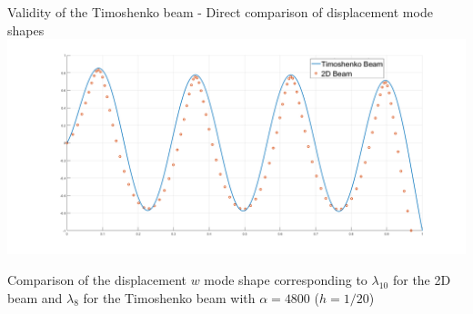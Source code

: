 \documentclass[8pt]{beamer}
\begin{document}
        \begin{frame}{Validity of the Timoshenko beam - Direct comparison of displacement mode shapes}
            \centering
            \includegraphics[scale=0.2]{1Dv2D.png} %
            \par
            \footnotesize Comparison of the displacement $w$ mode shape corresponding to $\lambda_{10}$ for the 2D beam and $\lambda_8$ for the Timoshenko beam with $\alpha = 4800$ ($h=1/20$)
        \end{frame}
        
\end{document}
